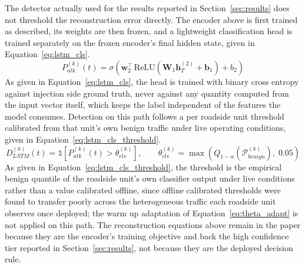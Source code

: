 \documentclass[final,5p,twocolumn]{elsarticle}
\theoremstyle{remark}
\theoremstyle{plain}
\begin{document}
The detector actually used for the results reported in
Section~\ref{sec:results} does not threshold the reconstruction error
directly. The encoder above is first trained as described, its weights are
then frozen, and a lightweight classification head is trained separately on
the frozen encoder's final hidden state, given in
Equation~\eqref{eq:lstm_cls}.
\begin{equation}
	P_{atk}^{(k)}(t) = \sigma\!\left(\mathbf{w}_2^{\top}\, \mathrm{ReLU}\!\left(\mathbf{W}_1 \mathbf{h}^{(2)}_T + \mathbf{b}_1\right) + b_2\right)
	\label{eq:lstm_cls}
\end{equation}
As given in Equation~\eqref{eq:lstm_cls}, the head is trained with binary
cross entropy against injection side ground truth, never against any
quantity computed from the input vector itself, which keeps the label
independent of the features the model consumes. Detection on this path
follows a per roadside unit threshold calibrated from that unit's own
benign traffic under live operating conditions, given in
Equation~\eqref{eq:lstm_cls_threshold}.
\begin{equation}
	D_{LSTM}^{(k)}(t) = \mathbb{1}\!\left[P_{atk}^{(k)}(t) > \theta_{cls}^{(k)}\right], \qquad \theta_{cls}^{(k)} = \max\!\left(Q_{1-\alpha}\!\left(\mathcal{P}^{(k)}_{benign}\right),\; 0.05\right)
	\label{eq:lstm_cls_threshold}
\end{equation}
As given in Equation~\eqref{eq:lstm_cls_threshold}, the threshold is the
empirical benign quantile of the roadside unit's own classifier output under
live conditions rather than a value calibrated offline, since offline
calibrated thresholds were found to transfer poorly across the
heterogeneous traffic each roadside unit observes once deployed; the warm up
adaptation of Equation~\eqref{eq:theta_adapt} is not applied on this path.
The reconstruction equations above remain in the paper because they are the
encoder's training objective and back the high confidence tier reported in
Section~\ref{sec:results}, not because they are the deployed decision rule.
\end{document}
